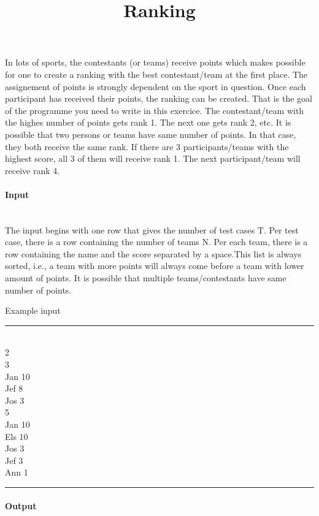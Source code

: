 \documentclass[10pt,a4paper]{article}
\begin{document}
\title{Ranking}
\maketitle



In lots of sports, the contestants (or teams) receive points which makes possible for one to create a ranking with the best contestant/team at the first place. The assignement of points is strongly dependent on the sport in question. Once each participant has received their points, the ranking can be created. That is the goal of the programme you need to write in this exercice. The contestant/team with the highes number of points gets rank 1. The next one gets rank 2, etc. It is possible that two persons or teams have same number of points. In that case, they both receive the same rank. If there are 3 participants/teams with the highest score, all 3 of them will receive rank 1. The next participant/team will receive rank 4.


\paragraph{Input\\ \\}
The input begins with one row that gives the number of test cases T. Per test case, there is a row containing the number of teams N. Per each team, there is a row containing the name and the score separated by a space.This list is always sorted, i.e., a team with more points will always come before a team with lower amount of points. It is possible that multiple teams/contestants have same number of points.



\begin{center}
Example input
\hrule
\end{center}
\mbox{}\\
2\\
3\\
Jan 10\\
Jef 8\\
Jos 3\\
5\\
Jan 10\\
Els 10\\
Jos 3\\
Jef 3\\
Ann 1\\
\hrule

	
\paragraph{Output\\ \\}
\end{document}
